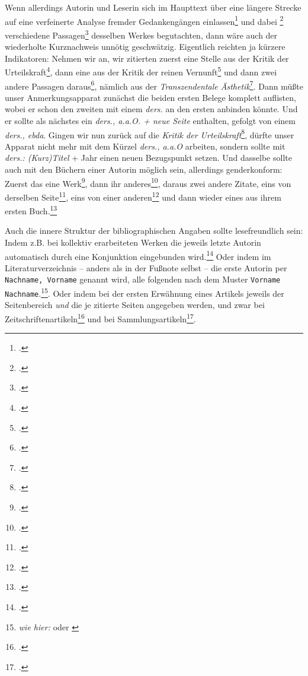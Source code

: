 Wenn allerdings Autorin und Leserin sich im Haupttext über eine längere Strecke auf eine verfeinerte Analyse fremder Gedankengängen einlassen\footcite[\emph{wie hier}: vgl. etwa][32]{Allen2001a} und dabei \footcite[\emph{wie hier}: vgl.][139]{Allen2001a} verschiedene Passagen\footcite[\emph{wie hier}: vgl.][139]{Allen2001a} desselben Werkes begutachten, dann wäre auch der wiederholte Kurznachweis unnötig geschwätzig. Eigentlich reichten ja kürzere Indikatoren: Nehmen wir an, wir zitierten zuerst eine Stelle aus der Kritik der Urteilskraft\footcite[vgl.][9]{KantKdU1974}, dann eine aus der Kritik der reinen Vernunft\footcite[vgl.][45]{KantKdV1974} und dann zwei andere Passagen daraus\footcite[vgl.][69]{KantKdV1974}, nämlich aus der \emph{Transzendentale Ästhetik}\footcite[vgl.][69]{KantKdV1974}. Dann müßte unser Anmerkungsapparat zunächst die beiden ersten Belege komplett auflisten, wobei er schon den zweiten mit einem \emph{ders.} an den ersten anbinden könnte. Und er sollte als nächstes ein \emph{ders., a.a.O. + neue Seite} enthalten, gefolgt von einem
\emph{ders., ebda}. Gingen wir nun zurück auf die \emph{Kritik der Urteilskraft}\footcite[vgl.][9]{KantKdU1974}, dürfte unser Apparat nicht mehr mit dem Kürzel \emph{ders., a.a.O} arbeiten, sondern sollte mit \emph{ders.: (Kurz)Titel} + Jahr einen neuen Bezugspunkt setzen. Und dasselbe sollte auch mit den Büchern einer Autorin möglich sein, allerdings genderkonform:\label{Gender} Zuerst das eine Werk\footcite[\emph{wie hier:} vgl.][99]{Hamburger1985a}, dann ihr anderes\footcite[\emph{wie hier:} vgl.][33]{Hamburger1980a}, daraus zwei andere Zitate, eins von derselben Seite\footcite[\emph{wie hier:} vgl.][33]{Hamburger1980a}, eins von einer anderen\footcite[\emph{wie hier:} vgl.][105]{Hamburger1980a} und dann wieder eines aus ihrem ersten Buch.\footcite[\emph{wie hier:} vgl.][99]{Hamburger1985a}

Auch die innere Struktur der bibliographischen Angaben sollte lesefreundlich sein: Indem z.B. bei kollektiv erarbeiteten Werken die jeweils letzte Autorin automatisch durch eine Konjunktion eingebunden wird.\footcite[\emph{wie hier}: vgl.][]{SegEvaTay2009a} Oder indem im Literaturverzeichnis -- anders als in der Fußnote selbst -- die erste Autorin per \texttt{Nachname, Vorname} genannt wird, alle folgenden nach dem Muster \texttt{Vorname Nachname}.\footnote{\emph{wie hier:} \cite[bei][]{GarSpr2018a} oder \cite[bei:][]{RusNor2004a}}. Oder indem bei der ersten Erwähnung eines Artikels jeweils der Seitenbereich \emph{und} die je zitierte Seiten angegeben werden, und zwar bei Zeitschriftenartikeln\footcite[\emph{wie hier:} vgl.][51]{Siart2008a} und bei Sammlungsartikeln\footcite[\emph{wie hier:} vgl.][269]{Frobenius1998a}.

